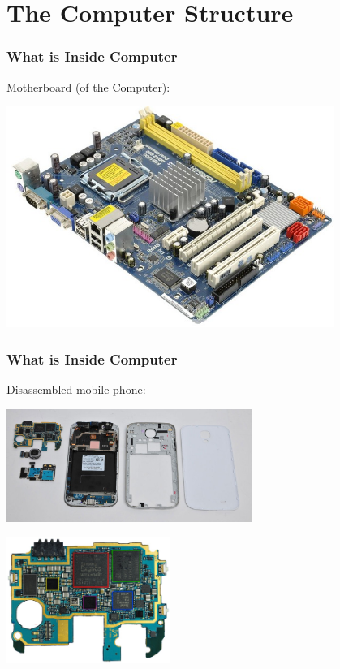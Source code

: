 \documentclass{beamer}
\begin{document}
\section{The Computer Structure}
\begin{frame}
\frametitle{What is Inside Computer}

Motherboard (of the Computer):
\begin{center}
   \includegraphics[width=0.8\textwidth]{fig/motherboard.jpg}
\end{center}

\end{frame}

\begin{frame}
\frametitle{What is Inside Computer}

Disassembled mobile phone:
\begin{center}
   \includegraphics[width=0.6\textwidth]{fig/mobile.jpg}
\end{center}
\begin{center}
   \includegraphics[width=0.4\textwidth]{fig/mobile-cpu.jpg}
\end{center}
\end{frame}
\end{document}
